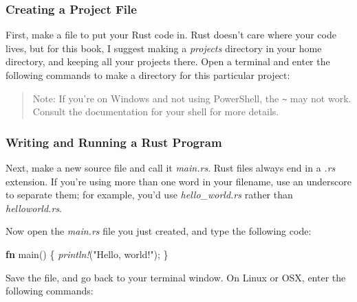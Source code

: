 \documentclass[a4paper,]{book}
\newenvironment{Shaded}{\begin{snugshade}}{\end{snugshade}}
\newcommand{\KeywordTok}[1]{\textcolor[rgb]{0.13,0.29,0.53}{\textbf{{#1}}}}
\newcommand{\StringTok}[1]{\textcolor[rgb]{0.31,0.60,0.02}{{#1}}}
\newcommand{\PreprocessorTok}[1]{\textcolor[rgb]{0.56,0.35,0.01}{\textit{{#1}}}}
\newcommand{\NormalTok}[1]{{#1}}
\begin{document}
\subsubsection{Creating a Project File}\label{creating-a-project-file}

First, make a file to put your Rust code in. Rust doesn't care where
your code lives, but for this book, I suggest making a \emph{projects}
directory in your home directory, and keeping all your projects there.
Open a terminal and enter the following commands to make a directory for
this particular project:

\begin{Shaded}
\end{Shaded}

\begin{quote}
Note: If you're on Windows and not using PowerShell, the
\texttt{\textasciitilde{}} may not work. Consult the documentation for
your shell for more details.
\end{quote}

\subsubsection{Writing and Running a Rust
Program}\label{writing-and-running-a-rust-program}

Next, make a new source file and call it \emph{main.rs}. Rust files
always end in a \emph{.rs} extension. If you're using more than one word
in your filename, use an underscore to separate them; for example, you'd
use \emph{hello\_world.rs} rather than \emph{helloworld.rs}.

Now open the \emph{main.rs} file you just created, and type the
following code:

\begin{Shaded}
\begin{Highlighting}[]
\KeywordTok{fn} \NormalTok{main() \{}
    \PreprocessorTok{println!}\NormalTok{(}\StringTok{"Hello, world!"}\NormalTok{);}
\NormalTok{\}}
\end{Highlighting}
\end{Shaded}

Save the file, and go back to your terminal window. On Linux or OSX,
enter the following commands:
\end{document}

